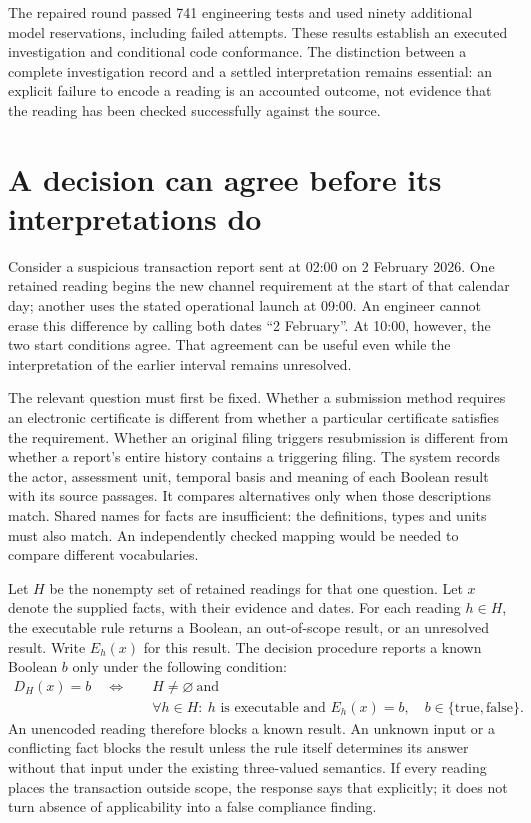 \documentclass[12pt,a4paper,oneside,openany]{book}
\begin{document}
The repaired round passed 741 engineering tests and used ninety additional
model reservations, including failed attempts. These results establish an
executed investigation and conditional code conformance. The distinction between
a complete investigation record and a settled interpretation remains essential:
an explicit failure to encode a reading is an accounted outcome, not evidence
that the reading has been checked successfully against the source.



\section{A decision can agree before its interpretations do}
\label{sec:invariant-decisions}

Consider a suspicious transaction report sent at 02:00 on 2 February 2026.
One retained reading begins the new channel requirement at the start of that
calendar day; another uses the stated operational launch at 09:00. An engineer
cannot erase this difference by calling both dates ``2 February''. At 10:00,
however, the two start conditions agree. That agreement can be useful even
while the interpretation of the earlier interval remains unresolved.
\cite{sfcstr2026}

The relevant question must first be fixed. Whether a submission method requires
an electronic certificate is different from whether a particular certificate
satisfies the requirement. Whether an original filing triggers resubmission is
different from whether a report's entire history contains a triggering filing.
The system records the actor, assessment unit, temporal basis and meaning of
each Boolean result with its source passages. It compares alternatives only
when those descriptions match. Shared names for facts are insufficient: the
definitions, types and units must also match. An independently checked mapping
would be needed to compare different vocabularies.

Let $H$ be the nonempty set of retained readings for that one question. Let $x$
denote the supplied facts, with their evidence and dates. For each reading
$h\in H$, the executable rule returns a Boolean, an out-of-scope result, or an
unresolved result. Write $E_h(x)$ for this result. The decision procedure reports
a known Boolean $b$ only under the following condition:
\begin{equation}
  \begin{split}
    D_H(x)=b \quad\Longleftrightarrow\quad &H\ne\varnothing\ \text{and}\\
    &\forall h\in H:\ h\text{ is executable and }E_h(x)=b,
    \quad b\in\{\mathrm{true},\mathrm{false}\}.
  \end{split}
  \label{eq:retained-unanimity}
\end{equation}
An unencoded reading therefore blocks a known result. An unknown input or a
conflicting fact blocks the result unless the rule itself determines its answer
without that input under the existing three-valued semantics. If every reading
places the transaction outside scope, the response says that explicitly; it
does not turn absence of applicability into a false compliance finding.
\end{document}
